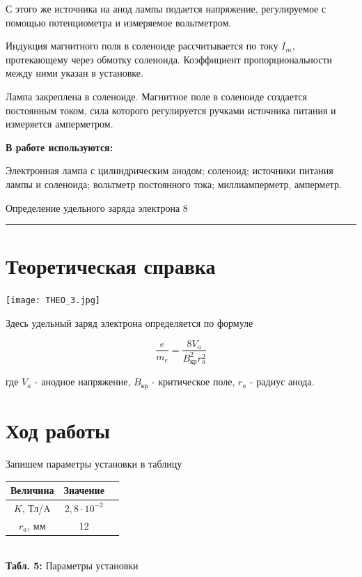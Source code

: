 \documentclass[12pt,a4paper]{scrartcl}
\begin{document}
С этого же источника на анод лампы подается напряжение, регулируемое с помощью потенциометра и измеряемое вольтметром.

Индукция магнитного поля в соленоиде рассчитывается по току $I_m$, протекающему через обмотку соленоида. Коэффициент пропорциональности между ними указан в установке.

Лампа закреплена в соленоиде. Магнитное поле в соленоиде создается постоянным током, сила которого регулируется ручками источника питания и измеряется амперметром.

	\textbf{В работе используются:}
	
	Электронная лампа с цилиндрическим анодом; соленоид; источники питания лампы и соленоида; вольтметр постоянного тока; миллиамперметр, амперметр.
	
\newpage
	
	\begin{flushleft}
		\footnotesize{Определение удельного заряда электрона} \hspace{\fill} \footnotesize{8}
		\\[-0.3cm]\noindent\rule{\textwidth}{0.3pt}
	\end{flushleft}

\section{Теоретическая справка}	

\begin{center}
    \texttt{[image: THEO\_3.jpg]}\\
  \end{center}
  
Здесь удельный заряд электрона определяется по формуле

$$\dfrac{e}{m_e} = \dfrac{8V_a}{B_{\text{кр}}^2r_a^2}$$

где $V_a$ - анодное напряжение, $B_{\text{кр}}$ - критическое поле, $r_a$ - радиус анода.
	
\section{Ход работы}

Запишем параметры установки в таблицу
\begin{center}
\begin{tabular}{|c|c|c|}
\hline
Величина & Значение  \\ \hline
$K$, Тл/A & $2,8 \cdot 10^{-2}$  \\ \hline
$r_a$, мм & 12  \\ \hline
\end{tabular}\\
\textbf{Табл. 5:} Параметры установки
\end{center}	
	
\end{document}
